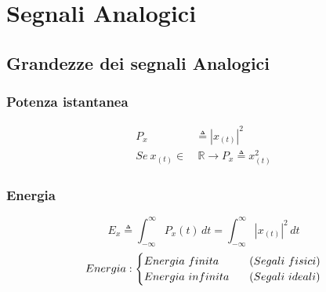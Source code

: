 \section{Segnali Analogici}
    \subsection{Grandezze dei segnali Analogici}
    
        \subsubsection{Potenza istantanea}\label{Potenza istantanea}
                \begin{align}
                    P_{x} & \triangleq |x_{(t)}|^2 \nonumber \\   
                    Se\ x_{(t)} \in &\ \mathbb{R} \rightarrow P_{x} \triangleq x_{(t)}^2 \nonumber
                \end{align}
        \subsubsection{Energia}
            \[
                E_{x} \triangleq \int_{-\infty}^{\infty} P_{x}(t) \,dt = \int_{-\infty}^{\infty} |x_{(t)}|^2 \,dt    
            \]
            \[
                Energia:
                \begin{cases}
                    Energia\ finita \hspace{0.3cm}& (Segali\ fisici) \\
                    Energia\ infinita \hspace{0.3cm}& (Segali\ ideali)
                \end{cases}  
            \]
